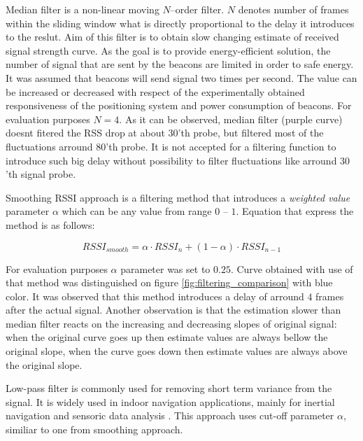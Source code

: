 \documentclass[../main.tex]{subfiles}
\begin{document}
Median filter is a non-linear moving $N$--order filter. $N$ denotes number of frames within the sliding window what is directly proportional to the delay it introduces to the reslut. Aim of this filter is to obtain slow changing estimate of received signal strength curve. As the goal is to provide energy-efficient solution, the number of signal that are sent by the beacons are limited in order to safe energy. It was assumed that beacons will send signal two times per second. The value can be increased or decreased with respect of the experimentally obtained responsiveness of the positioning system and power consumption of beacons. For evaluation purposes $N=4$. As it can be observed, median filter (purple curve) doesnt fitered the RSS drop at about $30$'th probe, but filtered most of the fluctuations arround $80$'th probe. It is not accepted for a filtering function to introduce such big delay without possibility to filter fluctuations like arround $30$'th signal probe.

Smoothing RSSI approach \cite{rssi_smoothing} is a filtering method that introduces a \textit{weighted value} parameter $\alpha$ which can be any value from range $0$ -- $1$. Equation that express the method is as follows:

\begin{equation}
\label{eq:rssi_smoothing}
	RSSI_{smooth} = \alpha \cdot RSSI_n + (1 - \alpha) \cdot RSSI_{n-1}
\end{equation}

For evaluation purposes $\alpha$ parameter was set to $0.25$. Curve obtained with use of that method was distinguished on figure \ref{fig:filtering_comparison} with blue color. It was observed that this method introduces a delay of arround $4$ frames after the actual signal. Another observation is that the estimation slower than median filter reacts on the increasing and decreasing slopes of original signal: when the original curve goes up then estimate values are always bellow the original slope, when the curve goes down then estimate values are always above the original slope.

Low-pass filter is commonly used for removing short term variance from the signal. It is widely used in indoor navigation applications, mainly for inertial navigation and sensoric data analysis \cite{indoor_positioning_for_ar}\cite{indoor_navi_for_android2}\cite{report_indoor_navi_for_smartphones}\cite{thesis_ins_algorithms_for_android}\cite{indoor_positioning_for_ar_PhD_GOOD}. This approach uses cut-off parameter $\alpha$, similiar to one from smoothing approach.
\end{document}
